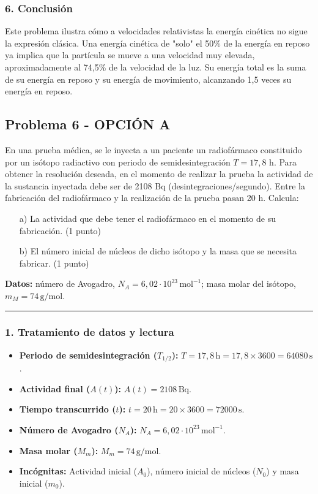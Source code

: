 \subsubsection*{6. Conclusión}
\begin{cajaconclusion}
Este problema ilustra cómo a velocidades relativistas la energía cinética no sigue la expresión clásica. Una energía cinética de "solo" el 50\% de la energía en reposo ya implica que la partícula se mueve a una velocidad muy elevada, aproximadamente al 74,5\% de la velocidad de la luz. Su energía total es la suma de su energía en reposo y su energía de movimiento, alcanzando 1,5 veces su energía en reposo.
\end{cajaconclusion}

\newpage

\subsection{Problema 6 - OPCIÓN A}
\label{subsec:6A_2018_jun_ord}
\begin{cajaenunciado}
En una prueba médica, se le inyecta a un paciente un radiofármaco constituido por un isótopo radiactivo con periodo de semidesintegración $T=17,8$ h. Para obtener la resolución deseada, en el momento de realizar la prueba la actividad de la sustancia inyectada debe ser de 2108 Bq (desintegraciones/segundo). Entre la fabricación del radiofármaco y la realización de la prueba pasan 20 h. Calcula:
\begin{itemize}
    \item[a)] La actividad que debe tener el radiofármaco en el momento de su fabricación. (1 punto)
    \item[b)] El número inicial de núcleos de dicho isótopo y la masa que se necesita fabricar. (1 punto)
\end{itemize}
\textbf{Datos:} número de Avogadro, $N_{A}=6,02\cdot10^{23}\,\text{mol}^{-1}$; masa molar del isótopo, $m_{M}=74\,\text{g/mol}$.
\end{cajaenunciado}
\hrule

\subsubsection*{1. Tratamiento de datos y lectura}
\begin{itemize}
    \item \textbf{Periodo de semidesintegración ($T_{1/2}$):} $T = 17,8 \, \text{h} = 17,8 \times 3600 = 64080 \, \text{s}$.
    \item \textbf{Actividad final ($A(t)$):} $A(t) = 2108 \, \text{Bq}$.
    \item \textbf{Tiempo transcurrido ($t$):} $t = 20 \, \text{h} = 20 \times 3600 = 72000 \, \text{s}$.
    \item \textbf{Número de Avogadro ($N_A$):} $N_A = 6,02\cdot10^{23} \, \text{mol}^{-1}$.
    \item \textbf{Masa molar ($M_m$):} $M_m = 74 \, \text{g/mol}$.
    \item \textbf{Incógnitas:} Actividad inicial ($A_0$), número inicial de núcleos ($N_0$) y masa inicial ($m_0$).
\end{itemize}

